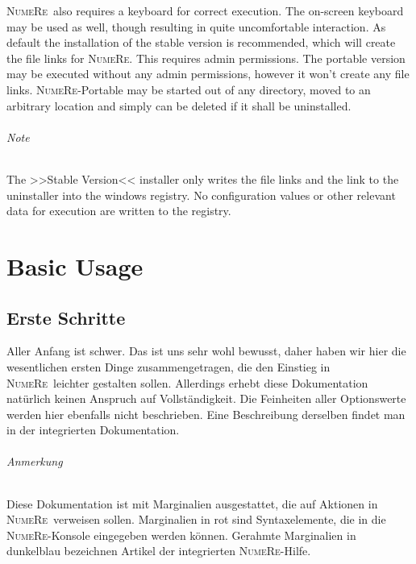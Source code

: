 \documentclass[DIV=14,headsepline,footsepline]{scrbook}
\newcommand{\NR}{\textsc{Nu\-me\-Re}}
\begin{document}
			\NR\ also requires a keyboard for correct execution. The on-screen keyboard may be used as well, though resulting in quite uncomfortable interaction.
			As default the installation of the stable version is recommended, which will create the file links for \NR. This requires admin permissions. The portable version may be executed without any admin permissions, however it won't create any file links. \NR-Portable may be started out of any directory, moved to an arbitrary location and simply can be deleted if it shall be uninstalled.
			\paragraph{Note}
				The >>Stable Version<< installer only writes the file links and the link to the uninstaller into the windows registry. No configuration values or other relevant data for execution are written to the registry.
	\part{Basic Usage}
		\chapter{Erste Schritte}
			Aller Anfang ist schwer. Das ist uns sehr wohl bewusst, daher haben wir hier die wesentlichen ersten Dinge zusammengetragen, die den Einstieg in \NR\ leichter gestalten sollen. Allerdings erhebt diese Dokumentation natürlich keinen Anspruch auf Vollständigkeit. Die Feinheiten aller Optionswerte werden hier ebenfalls nicht beschrieben. Eine Beschreibung derselben findet man in der integrierten Dokumentation.
			\paragraph{Anmerkung}
				Diese Dokumentation ist mit Marginalien ausgestattet, die auf Aktionen in \NR\ verweisen sollen. Marginalien in rot sind Syntaxelemente, die in die \NR-Konsole eingegeben werden können. Gerahmte Marginalien in dunkelblau bezeichnen Artikel der integrierten \NR-Hilfe.
\end{document}
